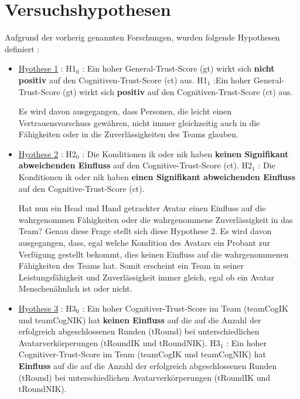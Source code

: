 \documentclass[a4paper,11pt]{article}%
\renewcommand{\\}{\vspace*{0.5\baselineskip} \newline}
\begin{document}
\section{Versuchshypothesen}
\label{Versuchshypothesen}
Aufgrund der vorherig genannten Forschungen, wurden folgende Hypothesen definiert :
\begin{itemize}
	\item{\underline{Hyothese 1} :\\ 
	H1$_{0}$ : Ein hoher General-Trust-Score (\ac{gt}) wirkt sich \textbf{nicht positiv} auf den Cognitiven-Trust-Score (\ac{ct}) aus. \\
	H1$_{1}$ :Ein hoher General-Trust-Score (\ac{gt}) wirkt sich \textbf{positiv} auf den Cognitiven-Trust-Score (\ac{ct}) aus.}
	
Es wird davon ausgegangen, dass Personen, die leicht einen Vertrauensvorschuss gewähren, nicht immer gleichzeitig auch in die Fähigkeiten oder in die Zuverlässigkeiten des Teams glauben.

\item{\underline{Hyothese 2} :\\ 
	H2$_{0}$ : Die Konditionen \ac{ik} oder \ac{nik} haben \textbf{keinen Signifikant abweichenden Einfluss} auf den Cognitive-Trust-Score (\ac{ct}). \\
	H2$_{1}$ : Die Konditionen \ac{ik} oder \ac{nik} haben \textbf{einen Signifikant abweichenden Einfluss} auf den Cognitive-Trust-Score (\ac{ct}).}

	
Hat nun ein Head und Hand getrackter Avatar einen Einfluss auf die wahrgenommen Fähigkeiten oder die wahrgenommene Zuverlässigkeit in das Team? Genau diese Frage stellt sich diese Hypothese 2.
Es wird davon ausgegangen, dass, egal welche Kondition des Avatars ein Probant zur Verfügung gestellt bekommt, dies keinen Einfluss auf die wahrgenommenen Fähigkeiten des Teams hat. Somit erscheint ein Team in seiner Leistungsfähigkeit und Zuverlässigkeit immer gleich, egal ob ein Avatar Menschenähnlich ist oder nicht.

	\item{\underline{Hyothese 3} :\\ 
	H3$_{0}$ : Ein hoher Cognitiver-Trust-Score im Team (\ac{teamCogIK} und \ac{teamCogNIK}) hat \textbf{keinen Einfluss} auf die auf die Anzahl der erfolgreich abgeschlossenen Runden (\ac{tRound}) bei unterschiedlichen Avatarverkörperungen (\ac{tRoundIK} und \ac{tRoundNIK}). \\
	H3$_{1}$ : Ein hoher Cognitiver-Trust-Score im Team (\ac{teamCogIK} und \ac{teamCogNIK}) hat \textbf{Einfluss} auf die auf die Anzahl der erfolgreich abgeschlossenen Runden (\ac{tRound}) bei unterschiedlichen Avatarverkörperungen (\ac{tRoundIK} und \ac{tRoundNIK}).}
	

\end{itemize}
\end{document}
